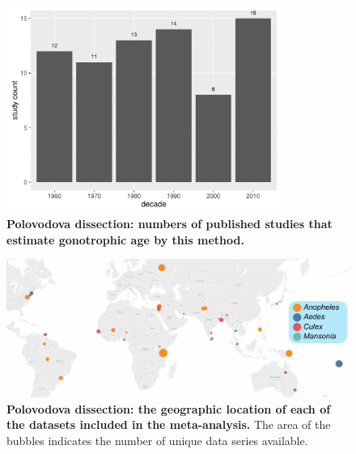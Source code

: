 \documentclass[12pt]{article}
\begin{document}
{\begin{figure}[ht]
	\centerline{\includegraphics[width=0.8\textwidth]{./Figure_files/dissection_timeSeries.pdf}}
	\caption{\textbf{Polovodova dissection: numbers of published studies that estimate gonotrophic age by this method.}}\label{fig:dissection_timeSeries}
\end{figure}


\begin{figure}[ht]
	\centerline{\includegraphics[width=1.25\textwidth]{./Figure_files/dissection_map.pdf}}
	\caption{\textbf{Polovodova dissection: the geographic location of each of the datasets included in the meta-analysis.} The area of the bubbles indicates the number of unique data series available.}\label{fig:dissection_map}
\end{figure}

}
\end{document}
